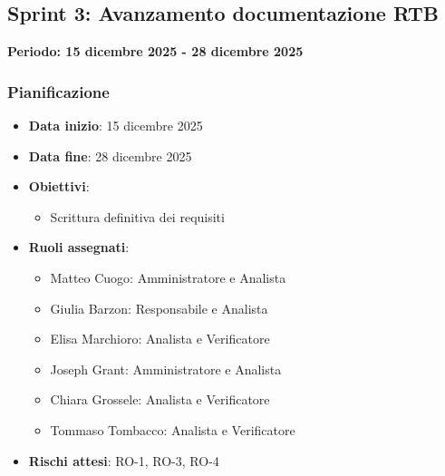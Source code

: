\documentclass[11pt,a4paper]{article}
\begin{document}
\newpage
\subsection{Sprint 3: Avanzamento documentazione RTB}
{\textbf{Periodo: 15 dicembre 2025 - 28 dicembre 2025}\par}

\subsubsection{Pianificazione}
\begin{itemize}
    \item \textbf{Data inizio}: 15 dicembre 2025
    \item \textbf{Data fine}: 28 dicembre 2025
    \item \textbf{Obiettivi}:
    \begin{itemize}
        \item Scrittura definitiva dei requisiti
    \end{itemize}
    
    \item \textbf{Ruoli assegnati}:
    \begin{itemize}
        \item Matteo Cuogo: Amministratore e Analista 
        \item Giulia Barzon: Responsabile e Analista
        \item Elisa Marchioro: Analista e Verificatore
        \item Joseph Grant: Amministratore e Analista
        \item Chiara Grossele: Analista e Verificatore
        \item Tommaso Tombacco: Analista e Verificatore
    \end{itemize}
    
    \item \textbf{Rischi attesi}: RO-1, RO-3, RO-4
\end{itemize}
\end{document}
